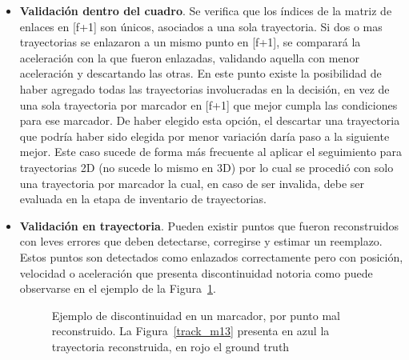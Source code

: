 \begin{itemize}
\item \textbf{Validación dentro del cuadro}. Se verifica que los índices de la matriz de enlaces en [f+1] son únicos, asociados a una sola trayectoria. Si dos o mas trayectorias se enlazaron a un mismo punto en [f+1], se comparará la aceleración con la que fueron enlazadas, validando aquella con menor aceleración y descartando las otras. En este punto existe la posibilidad de haber agregado todas las trayectorias involucradas en la decisión, en vez de una sola trayectoria por marcador en [f+1] que mejor cumpla las condiciones para ese marcador. De haber elegido esta opción, el descartar una trayectoria que podría haber sido elegida por menor variación daría paso a la siguiente mejor. Este caso sucede de forma más frecuente al aplicar el seguimiento para trayectorias 2D (no sucede lo mismo en 3D) por lo cual se procedió con solo una trayectoria por marcador la cual, en caso de ser invalida, debe ser evaluada en la etapa de inventario de trayectorias.  
\item \textbf{Validación en trayectoria}. Pueden existir puntos que fueron reconstruidos con leves errores que deben detectarse, corregirse y estimar un reemplazo. Estos puntos son detectados como enlazados correctamente pero con posición, velocidad o aceleración que presenta discontinuidad notoria como puede observarse en el ejemplo de la Figura~\ref{discontinuidad_tracking}.

\begin{figure}[H]
 \centering
 \caption{Ejemplo de discontinuidad en un marcador, por punto mal reconstruido. La Figura~\ref{track_m13} presenta en azul la trayectoria reconstruida, en rojo el ground truth}
 \label{discontinuidad_tracking}
\end{figure}


\end{itemize}
